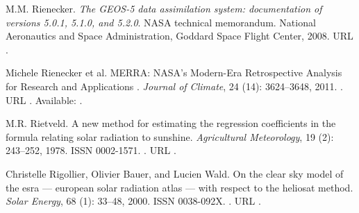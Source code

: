 \documentclass[letterpaper,12pt, twoside]{report}
\providecommand{\DIFdeltex}[1]{{\protect\color{red} \scriptsize #1}} %
\providecommand{\DIFdel}[1]{\texorpdfstring{\DIFdeltex{#1}}{}} %
\begin{document}
\DIFdel{M.M. Rienecker.
}%
\DIFdel{\emph{The GEOS-5 data assimilation system: documentation of versions
  5.0.1, 5.1.0, and 5.2.0}.
}%
\DIFdel{NASA technical memorandum. National Aeronautics and Space
  Administration, Goddard Space Flight Center, 2008.
}%
\DIFdel{URL }%
\DIFdel{.
}%

\DIFdel{Michele }%
\DIFdel{Rienecker et al.}%
\DIFdel{MERRA: NASA’s Modern-Era Retrospective Analysis for Research and
  Applications}%
\DIFdel{.
}%
\DIFdel{\emph{Journal of Climate}, 24}%
\DIFdel{(14):}%
\DIFdel{3624--3648,
  2011.
}%
\DIFdel{.
}%
\DIFdel{URL
  }%
\DIFdel{.
}%
\DIFdel{Available: }%
\DIFdel{.
}%

\DIFdel{M.R. Rietveld.
}%
\DIFdel{A new method for estimating the regression coefficients in the
  formula relating solar radiation to sunshine.
}%
\DIFdel{\emph{Agricultural Meteorology}, 19}%
\DIFdel{(2):}%
\DIFdel{243--252,
  1978.
}%
\DIFdel{ISSN 0002-1571.
}%
\DIFdel{.
}%
\DIFdel{URL
  }%
\DIFdel{.
}%

\DIFdel{Christelle Rigollier, Olivier Bauer, and Lucien Wald.
}%
\DIFdel{On the clear sky model of the esra — european solar radiation atlas
  — with respect to the heliosat method.
}%
\DIFdel{\emph{Solar Energy}, 68}%
\DIFdel{(1):}%
\DIFdel{33--48, 2000.
}%
\DIFdel{ISSN 0038-092X.
}%
\DIFdel{.
}%
\DIFdel{URL
  }%
\DIFdel{.
}%
\end{document}
